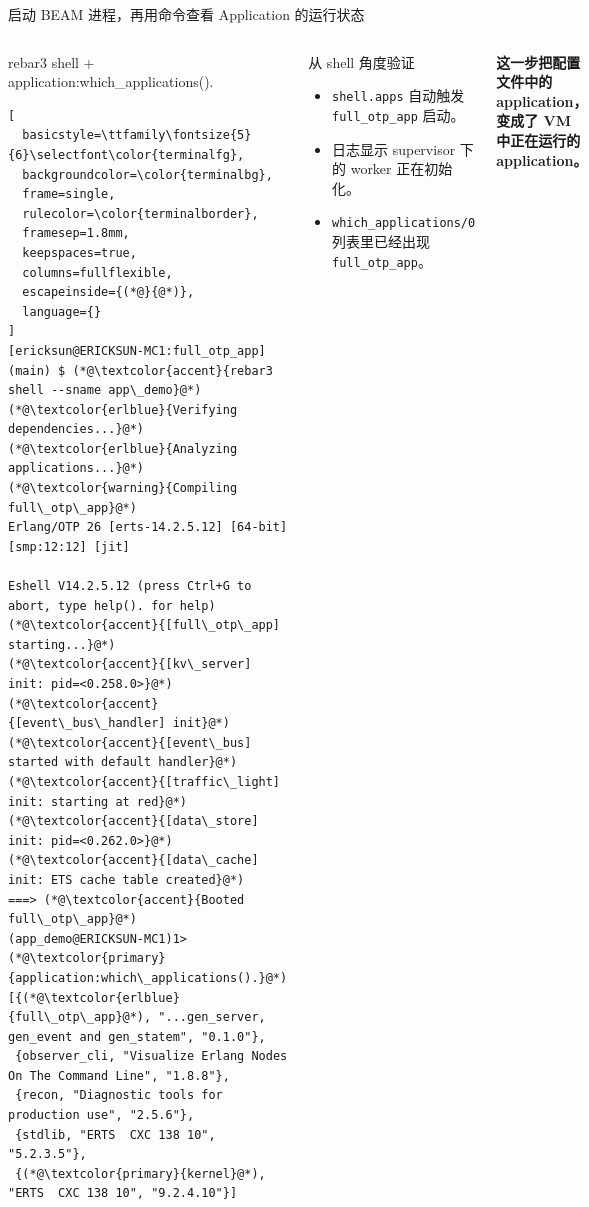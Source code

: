 \documentclass[aspectratio=169, 9pt]{beamer}
\newcommand{\good}[1]{\textbf{\color{accent!80!black}#1}}
\newcommand{\code}[1]{\texttt{#1}}
\begin{document}
\begin{frame}[fragile]{启动 BEAM 进程，再用命令查看 Application 的运行状态}
  \begin{columns}[T,onlytextwidth]
    \begin{block}{rebar3 shell + application:which\_applications().}
\begin{lstlisting}[
  basicstyle=\ttfamily\fontsize{5}{6}\selectfont\color{terminalfg},
  backgroundcolor=\color{terminalbg},
  frame=single,
  rulecolor=\color{terminalborder},
  framesep=1.8mm,
  keepspaces=true,
  columns=fullflexible,
  escapeinside={(*@}{@*)},
  language={}
]
[ericksun@ERICKSUN-MC1:full_otp_app] (main) $ (*@\textcolor{accent}{rebar3 shell --sname app\_demo}@*)
(*@\textcolor{erlblue}{Verifying dependencies...}@*)
(*@\textcolor{erlblue}{Analyzing applications...}@*)
(*@\textcolor{warning}{Compiling full\_otp\_app}@*)
Erlang/OTP 26 [erts-14.2.5.12] [64-bit] [smp:12:12] [jit]

Eshell V14.2.5.12 (press Ctrl+G to abort, type help(). for help)
(*@\textcolor{accent}{[full\_otp\_app] starting...}@*)
(*@\textcolor{accent}{[kv\_server] init: pid=<0.258.0>}@*)
(*@\textcolor{accent}{[event\_bus\_handler] init}@*)
(*@\textcolor{accent}{[event\_bus] started with default handler}@*)
(*@\textcolor{accent}{[traffic\_light] init: starting at red}@*)
(*@\textcolor{accent}{[data\_store] init: pid=<0.262.0>}@*)
(*@\textcolor{accent}{[data\_cache] init: ETS cache table created}@*)
===> (*@\textcolor{accent}{Booted full\_otp\_app}@*)
(app_demo@ERICKSUN-MC1)1> (*@\textcolor{primary}{application:which\_applications().}@*)
[{(*@\textcolor{erlblue}{full\_otp\_app}@*), "...gen_server, gen_event and gen_statem", "0.1.0"},
 {observer_cli, "Visualize Erlang Nodes On The Command Line", "1.8.8"},
 {recon, "Diagnostic tools for production use", "2.5.6"},
 {stdlib, "ERTS  CXC 138 10", "5.2.3.5"},
 {(*@\textcolor{primary}{kernel}@*), "ERTS  CXC 138 10", "9.2.4.10"}]
\end{lstlisting}
    \end{block}
    \footnotesize
    \begin{block}{从 shell 角度验证}
      \begin{itemize}
        \item \code{shell.apps} 自动触发 \code{full\_otp\_app} 启动。
        \item 日志显示 supervisor 下的 worker 正在初始化。
        \item \code{which\_applications/0} 列表里已经出现 \code{full\_otp\_app}。
      \end{itemize}
    \end{block}
    \vspace{0.15cm}
    \centering
    \good{这一步把配置文件中的 application，变成了 VM 中正在运行的 application。}
  \end{columns}
\end{frame}
\end{document}
